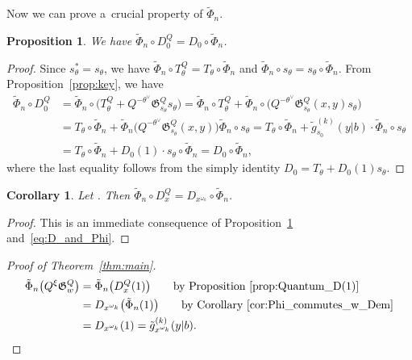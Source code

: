 \documentclass[pdftex]{sigma}
\numberwithin{equation}{section}
\newcommand{\Gro}[1]{\mathfrak{G}^Q_{#1}}
\newtheorem{Corollary}[Theorem]{Corollary}
\newtheorem{Proposition}[Theorem]{Proposition}
\theoremstyle{definition}
\begin{document}
Now we can prove a~crucial property of $\tilde{\Phi}_n$.
\begin{Proposition}\label{prop:Phi_D0} We have
$\tilde{\Phi}_n\circ D_0^{Q}=D_0\circ\tilde{\Phi}_n
$.
\end{Proposition}
\begin{proof}
Since $s_\theta^*=s_\theta$, we have $\tilde{\Phi}_n\circ T_\theta^Q
=T_\theta \circ \tilde{\Phi}_n$
and $\tilde{\Phi}_n\circ s_\theta
=s_\theta \circ \tilde{\Phi}_n$.
From Proposition~\ref{prop:key}, we have
\begin{align*}
\tilde{\Phi}_n\circ D_0^{Q}&=\tilde{\Phi}_n
\circ \bigl(T_\theta^{Q}+
Q^{-\theta^\vee}
\Gro{s_\theta}
s_\theta
\bigr)=\tilde{\Phi}_n\circ T_\theta^{Q}+
\tilde{\Phi}_n\circ\bigl(Q^{-\theta^\vee}
\Gro{s_\theta}(x,y)
s_\theta\bigr)\\
&=T_\theta\circ\tilde{\Phi}_n
+
\tilde{\Phi}_n\bigl(Q^{-\theta^\vee}
\Gro{s_\theta}(x,y)\bigr)
\tilde{\Phi}_n\circ
s_\theta=T_\theta\circ\tilde{\Phi}_n+
\tilde{g}_{s_0}^{(k)}(y|b)\cdot
\tilde{\Phi}_n\circ
s_\theta
\\
&=T_\theta\circ\tilde{\Phi}_n+
D_0(1)\cdot
s_\theta\circ \tilde{\Phi}_n=D_0\circ\tilde{\Phi}_n,
\end{align*}
where the last equality follows from the simply identity
$
D_0=T_\theta
+ D_0(1)
s_\theta$.
\end{proof}


\begin{Corollary}\label{cor:Phi_commutes_w_Dem}
Let . Then
$
\tilde{\Phi}_n\circ D_x^Q=
D_{x^{\omega_k}}
\circ \tilde{\Phi}_n$.
\end{Corollary}
\begin{proof}
This is an immediate consequence of Proposition~\ref{prop:Phi_D0} and~\eqref{eq:D_and_Phi}.
\end{proof}



\begin{proof}[Proof of Theorem~\ref{thm:main}]
 \begin{align*}
 \tilde{\Phi}_n\bigl(Q^\xi \Gro{w}\bigr)
&=
\tilde{\Phi}_n\bigl(D_x^Q(1)\bigr) \qquad \text{by Proposition~\ref{prop:Quantum_D(1)}}\\
&={D}_{x^{\omega_k}}\bigl(\tilde{\Phi}_n(1)\bigr) \qquad \text{by Corollary~\ref{cor:Phi_commutes_w_Dem}}\\
&={D}_{x^{\omega_k}}(1)=\tilde{g}_{x^{\omega_k}}^{(k)}(y|b).\tag*{\qed}
\end{align*} \renewcommand{\qed}{}
\end{proof}
\end{document}
